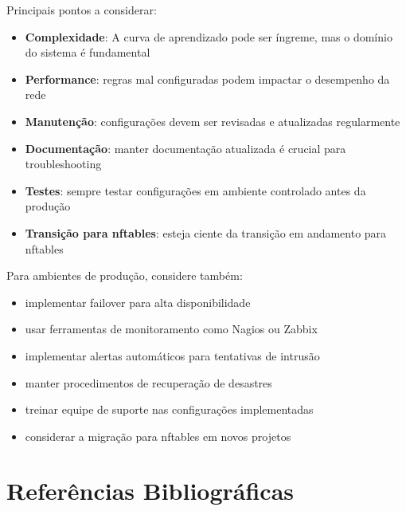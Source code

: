 ﻿\documentclass[12pt,fleqn]{article}
\begin{document}
Principais pontos a considerar:

\begin{itemize}
    \item \textbf{Complexidade}: A curva de aprendizado pode ser íngreme, mas o domínio do sistema é fundamental
    \item \textbf{Performance}: regras mal configuradas podem impactar o desempenho da rede
    \item \textbf{Manutenção}: configurações devem ser revisadas e atualizadas regularmente
    \item \textbf{Documentação}: manter documentação atualizada é crucial para troubleshooting
    \item \textbf{Testes}: sempre testar configurações em ambiente controlado antes da produção
    \item \textbf{Transição para nftables}: esteja ciente da transição em andamento para nftables
\end{itemize}

Para ambientes de produção, considere também:

\begin{itemize}
    \item implementar failover para alta disponibilidade
    \item usar ferramentas de monitoramento como Nagios ou Zabbix
    \item implementar alertas automáticos para tentativas de intrusão
    \item manter procedimentos de recuperação de desastres
    \item treinar equipe de suporte nas configurações implementadas
    \item considerar a migração para nftables em novos projetos
\end{itemize}

\section{Referências Bibliográficas}
\end{document}

